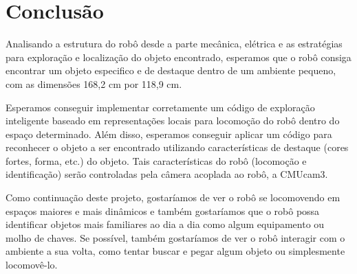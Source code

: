 \chapter{Conclusão}

Analisando a estrutura do robô desde a parte mecânica, elétrica e as estratégias para exploração e localização do objeto encontrado, esperamos que o robô consiga encontrar um objeto especifico e de destaque dentro de um ambiente pequeno, com as dimensões 168,2 cm por 118,9 cm.

Esperamos conseguir implementar corretamente um código de exploração inteligente baseado em representações locais para locomoção do robô dentro do espaço determinado. Além disso, esperamos conseguir aplicar um código para reconhecer o objeto a ser encontrado utilizando características de destaque (cores fortes, forma, etc.) do objeto. Tais características do robô (locomoção e identificação) serão controladas pela câmera acoplada ao robô, a CMUcam3.

Como continuação deste projeto, gostaríamos de ver o robô se locomovendo em espaços maiores e mais dinâmicos e também gostaríamos que o robô possa identificar objetos mais familiares ao dia a dia como algum equipamento ou molho de chaves. Se possível, também gostaríamos de ver o robô interagir com o ambiente a sua volta, como tentar buscar e pegar algum objeto ou simplesmente locomovê-lo. 
